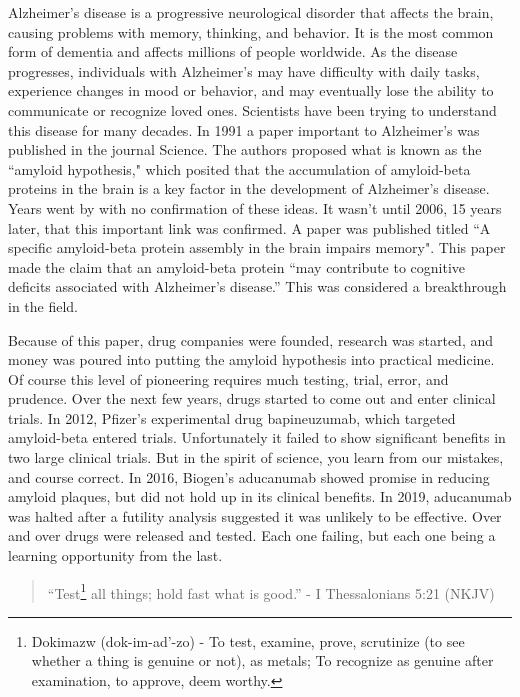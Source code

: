 \documentclass[10pt]{article}
\begin{document}
\begin{multicols}{2}
Alzheimer's disease is a progressive neurological disorder that affects the brain, causing problems with memory, thinking, and behavior. It is the most common form of dementia and affects millions of people worldwide. As the disease progresses, individuals with Alzheimer's may have difficulty with daily tasks, experience changes in mood or behavior, and may eventually lose the ability to communicate or recognize loved ones. Scientists have been trying to understand this disease for many decades. In 1991 a paper important to Alzheimer's was published in the journal Science\cite{John}. The authors proposed what is known as the ``amyloid hypothesis," which posited that the accumulation of amyloid-beta proteins in the brain is a key factor in the development of Alzheimer's disease. Years went by with no confirmation of these ideas. It wasn't until 2006, 15 years later, that this important link was confirmed. A paper was published titled ``A specific amyloid-beta protein assembly in the brain impairs memory"\cite{Sylvain}. This paper made the claim that an amyloid-beta protein ``may contribute to cognitive deficits associated with Alzheimer's disease.'' This was considered a breakthrough in the field.

Because of this paper, drug companies were founded, research was started, and money was poured into putting the amyloid hypothesis into practical medicine. Of course this level of pioneering requires much testing, trial, error, and prudence. Over the next few years, drugs started to come out and enter clinical trials. In 2012, Pfizer's experimental drug bapineuzumab, which targeted amyloid-beta entered trials. Unfortunately it failed to show significant benefits in two large clinical trials. But in the spirit of science, you learn from our mistakes, and course correct. In 2016, Biogen's aducanumab showed promise in reducing amyloid plaques, but did not hold up in its clinical benefits. In 2019, aducanumab was halted after a futility analysis suggested it was unlikely to be effective. Over and over drugs were released and tested. Each one failing, but each one being a learning opportunity from the last. 

\begin{quotation}
``Test\footnote{Dokimazw (dok-im-ad'-zo) - To test, examine, prove, scrutinize (to see whether a thing is genuine or not), as metals; To recognize as genuine after examination, to approve, deem worthy.} all things; hold fast what is good.'' - I Thessalonians 5:21 (NKJV)
\end{quotation}


\end{multicols}
\end{document}
